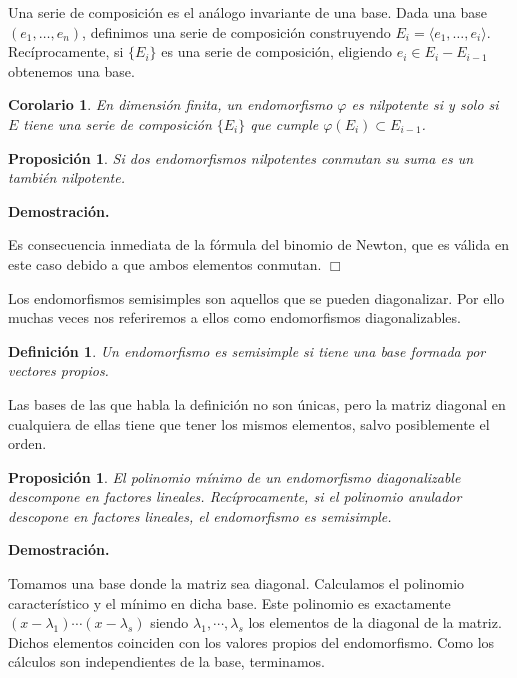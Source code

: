 \documentclass[a4paper,draft,12pt]{scrartcl}
\newtheorem{defi}{Definición}[section]%
\newtheorem{propo}[teo]{Proposición}%
\newtheorem{cor}[teo]{Corolario}%
\newcommand{\dem}{\noindent \textbf{Demostración. }\vspace{0.3 cm}}%
\newcommand{\fin}{ $\Box $ \vspace{0.4 cm}}
\newcommand{\df}[1]{\textsf{\color{blue}#1}}
\begin{document}
Una serie de composición es el análogo invariante de una base.  Dada una base $(e_1,\dots,e_n)$, definimos una serie de composición construyendo $E_i= \langle e_1, \dots ,e_i\rangle$.  Recíprocamente, si $\{E_i\}$ es una serie de composición, eligiendo $e_i \in E_i -E_{i-1}$ obtenemos una base.

\begin{cor}

En dimensión finita, un endomorfismo $\varphi$ es nilpotente si y solo si $E$ tiene una serie de composición $\{E_i\}$ que cumple $\varphi(E_i) \subset E_{i-1}$.

\end{cor}

\begin{propo}

Si dos endomorfismos nilpotentes conmutan su suma es un también nilpotente.

\end{propo}

\dem

Es consecuencia inmediata de la fórmula del binomio de Newton, que es válida en este caso debido a que ambos elementos conmutan. \fin


Los endomorfismos semisimples son aquellos que se pueden diagonalizar.  Por ello muchas veces nos referiremos a ellos como endomorfismos diagonalizables.

\begin{defi}

Un endomorfismo es  \df{semisimple}  si tiene una base formada por  vectores propios.

\end{defi}

Las bases de las que habla la definición no son únicas, pero la matriz diagonal en cualquiera de ellas tiene que tener los mismos elementos, salvo posiblemente el orden.

\begin{propo}

El polinomio mínimo de un endomorfismo diagonalizable descompone en factores lineales.  Recíprocamente, si el polinomio anulador descopone en factores lineales, el endomorfismo es semisimple.

\end{propo}

\dem

Tomamos una base donde la matriz sea diagonal.  Calculamos el polinomio característico y el mínimo en dicha base. Este polinomio es exactamente $(x-\lambda_1) \cdots (x-\lambda_s)$ siendo $\lambda_1, \cdots, \lambda_s$ los elementos de la diagonal de la matriz.  Dichos elementos coinciden con los valores propios del endomorfismo.  Como los cálculos son independientes de la base, terminamos.
\end{document}

